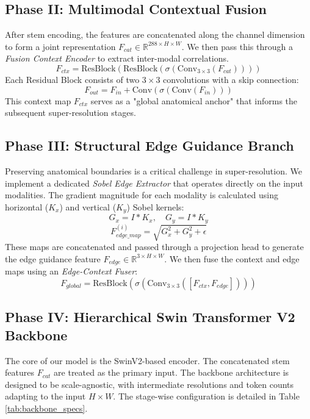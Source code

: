 \documentclass{IEEEoj}
\begin{document}
\subsection{Phase II: Multimodal Contextual Fusion}
After stem encoding, the features are concatenated along the channel dimension to form a joint representation $F_{cat} \in \mathbb{R}^{288 \times H \times W}$. We then pass this through a \textit{Fusion Context Encoder} to extract inter-modal correlations.
\begin{equation}
    F_{ctx} = \text{ResBlock}(\text{ResBlock}(\sigma(\text{Conv}_{3\times3}(F_{cat}))))
\end{equation}
Each Residual Block consists of two $3 \times 3$ convolutions with a skip connection:
\begin{equation}
    F_{out} = F_{in} + \text{Conv}(\sigma(\text{Conv}(F_{in})))
\end{equation}
This context map $F_{ctx}$ serves as a "global anatomical anchor" that informs the subsequent super-resolution stages.

\subsection{Phase III: Structural Edge Guidance Branch}
Preserving anatomical boundaries is a critical challenge in super-resolution. We implement a dedicated \textit{Sobel Edge Extractor} that operates directly on the input modalities.
The gradient magnitude for each modality is calculated using horizontal ($K_x$) and vertical ($K_y$) Sobel kernels:
\begin{equation}
    G_x = I \ast K_x, \quad G_y = I \ast K_y
\end{equation}
\begin{equation}
    F_{edge\_map}^{(i)} = \sqrt{G_x^2 + G_y^2 + \epsilon}
\end{equation}
These maps are concatenated and passed through a projection head to generate the edge guidance feature $F_{edge} \in \mathbb{R}^{3 \times H \times W}$. We then fuse the context and edge maps using an \textit{Edge-Context Fuser}:
\begin{equation}
    F_{global} = \text{ResBlock}(\sigma(\text{Conv}_{3\times3}([F_{ctx}, F_{edge}])))
\end{equation}

\subsection{Phase IV: Hierarchical Swin Transformer V2 Backbone}
The core of our model is the SwinV2-based encoder. The concatenated stem features $F_{cat}$ are treated as the primary input. The backbone architecture is designed to be scale-agnostic, with intermediate resolutions and token counts adapting to the input $H \times W$. The stage-wise configuration is detailed in Table \ref{tab:backbone_specs}.
\end{document}
